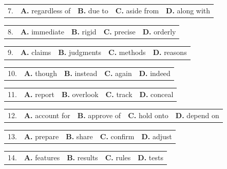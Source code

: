 \documentclass[UTF8,11pt]{ctexart}
\begin{document}
\noindent\begin{tabularx}{\linewidth}{@{}lXXXX@{}}7. & \textbf{A.} regardless of & \textbf{B.} due to & \textbf{C.} aside from & \textbf{D.} along with\\\end{tabularx}\par

\noindent\begin{tabularx}{\linewidth}{@{}lXXXX@{}}8. & \textbf{A.} immediate & \textbf{B.} rigid & \textbf{C.} precise & \textbf{D.} orderly\\\end{tabularx}\par

\noindent\begin{tabularx}{\linewidth}{@{}lXXXX@{}}9. & \textbf{A.} claims & \textbf{B.} judgments & \textbf{C.} methods & \textbf{D.} reasons\\\end{tabularx}\par

\noindent\begin{tabularx}{\linewidth}{@{}lXXXX@{}}10. & \textbf{A.} though & \textbf{B.} instead & \textbf{C.} again & \textbf{D.} indeed\\\end{tabularx}\par

\noindent\begin{tabularx}{\linewidth}{@{}lXXXX@{}}11. & \textbf{A.} report & \textbf{B.} overlook & \textbf{C.} track & \textbf{D.} conceal\\\end{tabularx}\par

\noindent\begin{tabularx}{\linewidth}{@{}lXXXX@{}}12. & \textbf{A.} account for & \textbf{B.} approve of & \textbf{C.} hold onto & \textbf{D.} depend on\\\end{tabularx}\par

\noindent\begin{tabularx}{\linewidth}{@{}lXXXX@{}}13. & \textbf{A.} prepare & \textbf{B.} share & \textbf{C.} confirm & \textbf{D.} adjust\\\end{tabularx}\par

\noindent\begin{tabularx}{\linewidth}{@{}lXXXX@{}}14. & \textbf{A.} features & \textbf{B.} results & \textbf{C.} rules & \textbf{D.} tests\\\end{tabularx}\par
\end{document}
